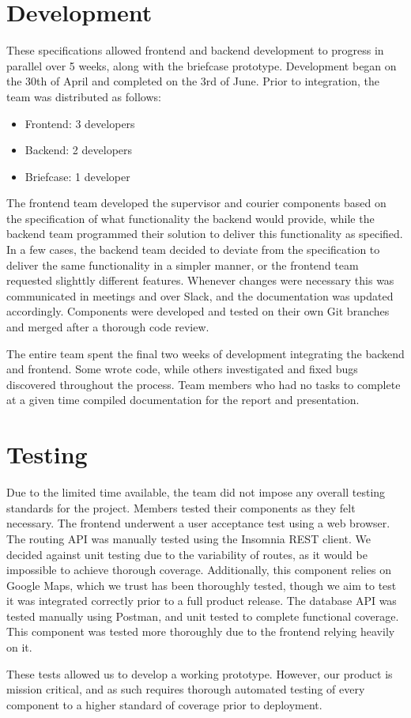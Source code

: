 \section{Development}

These specifications allowed frontend and backend development to progress in parallel over 5 weeks, along with the briefcase prototype. Development began on the 30th of April and completed on the 3rd of June. Prior to integration, the team was distributed as follows:

\begin{itemize}
    \item Frontend: 3 developers
    \item Backend: 2 developers
    \item Briefcase: 1 developer
\end{itemize}

The frontend team developed the supervisor and courier components based on the specification of what functionality the backend would provide, while the backend team programmed their solution to deliver this functionality as specified. In a few cases, the backend team decided to deviate from the specification to deliver the same functionality in a simpler manner, or the frontend team requested slighttly different features. Whenever changes were necessary this was communicated in meetings and over Slack, and the documentation was updated accordingly. Components were developed and tested on their own Git branches and merged after a thorough code review.

The entire team spent the final two weeks of development integrating the backend and frontend. Some wrote code, while others investigated and fixed bugs discovered throughout the process. Team members who had no tasks to complete at a given time compiled documentation for the report and presentation.

\section{Testing}
Due to the limited time available, the team did not impose any overall testing standards for the project. Members tested their components as they felt necessary. The frontend underwent a user acceptance test using a web browser. The routing API was manually tested using the Insomnia REST client. We decided against unit testing due to the variability of routes, as it would be impossible to achieve thorough coverage. Additionally, this component relies on Google Maps, which we trust has been thoroughly tested, though we aim to test it was integrated correctly prior to a full product release. The database API was tested manually using Postman, and unit tested to complete functional coverage. This component was tested more thoroughly due to the frontend relying heavily on it.

These tests allowed us to develop a working prototype. However, our product is mission critical, and as such requires thorough automated testing of every component to a higher standard of coverage prior to deployment.
